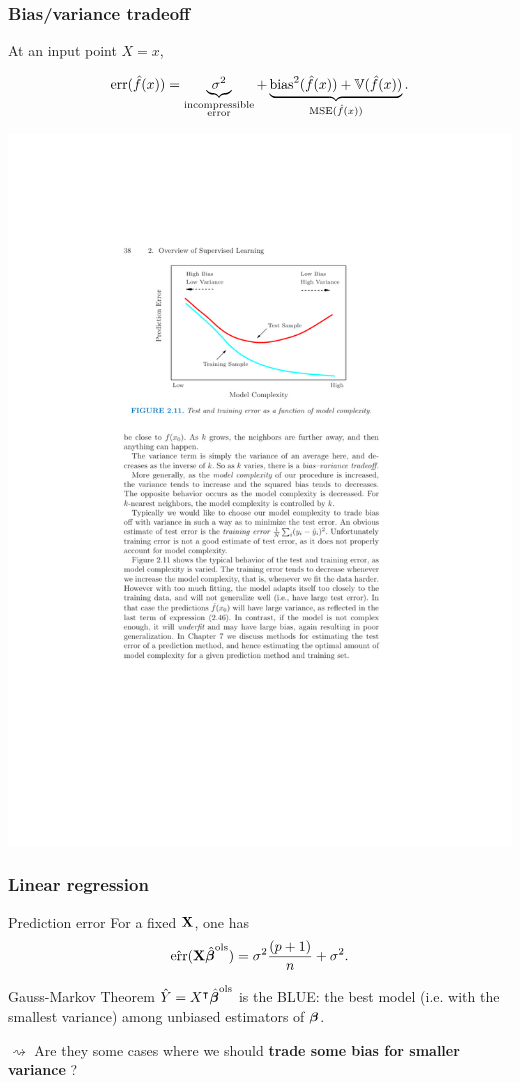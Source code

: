 \documentclass[10pt, c, xcolor=x11names]{beamer}\usepackage[]{graphicx}\usepackage[]{color}
\begin{document}
\begin{frame}
  \frametitle{Bias/variance tradeoff}

  At an input point $X=x$,
  \begin{overlayarea}{\textwidth}{\textheight}
    \begin{equation*}
      \mathrm{err}(\hat{f}(x))                =
      \underbrace{\sigma^2}_{\substack{\text{incompressible}\\\text{error}}}
      +
      \underbrace{\text{bias}^2(\hat{f}(x))                    +
        \mathbb{V}(\hat{f}(x))}_{\mathrm{MSE}(\hat{f}(x))}.
    \end{equation*}

    \begin{center}
      \includegraphics[width=.7\textwidth]{figures/tradeoff}
    \end{center}
  \end{overlayarea}

\end{frame}

\begin{frame}
  \frametitle{Linear regression}

  \begin{block}{Prediction error}
    For a fixed $\mathbf{X}$, one has
   \begin{equation*}
      \hat{\mathrm{err}}(\mathbf{X} \,\hat{\!\boldsymbol\beta}^{\mathrm{ols}})  = \sigma^2 \frac{(p+1)}{n} + \sigma^2.
    \end{equation*}
  \end{block}
  \vfill  
  
  \begin{block}{Gauss-Markov Theorem}
    $\hat Y = X^\intercal \,\hat{\!\boldsymbol\beta}^{\mathrm{ols}}$ is the BLUE: the best model 
    (i.e. with the smallest variance) among unbiased estimators of 
    $\boldsymbol\beta$.
  \end{block}
  \vfill

  $\rightsquigarrow$ Are  they some  cases where we  should \alert{\bf
    trade some bias for smaller variance} ?
\end{frame}
\end{document}
